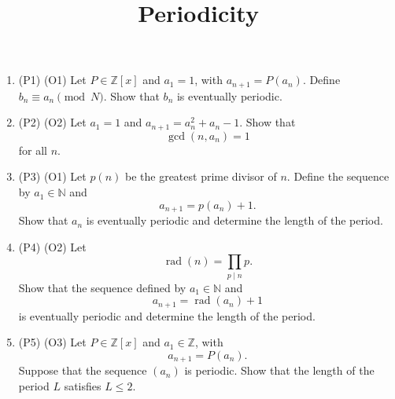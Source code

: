 \documentclass{article}
\title{Periodicity}
\author{}
\date{}
\begin{document}
	
	\maketitle
	
	\begin{enumerate}
		
		\item (P1) (O1) Let $P \in \mathbb{Z}[x]$ and $a_1 = 1$, with $a_{n+1} = P(a_n)$. Define $b_n \equiv a_n \pmod{N}$. Show that $b_n$ is eventually periodic.
		
		\item (P2) (O2) Let $a_1 = 1$ and $a_{n+1} = a_n^2 + a_n - 1$. Show that
		\[
		\gcd(n, a_n) = 1
		\]
		for all $n$.
		
		\item (P3) (O1) Let $p(n)$ be the greatest prime divisor of $n$. Define the sequence by $a_1 \in \mathbb{N}$ and
		\[
		a_{n+1} = p(a_n) + 1.
		\]
		Show that $a_n$ is eventually periodic and determine the length of the period.
		
		\item (P4) (O2) Let
		\[
		\operatorname{rad}(n) = \prod_{p \mid n} p.
		\]
		Show that the sequence defined by $a_1 \in \mathbb{N}$ and
		\[
		a_{n+1} = \operatorname{rad}(a_n) + 1
		\]
		is eventually periodic and determine the length of the period.
		
		\item (P5) (O3) Let $P \in \mathbb{Z}[x]$ and $a_1 \in \mathbb{Z}$, with
		\[
		a_{n+1} = P(a_n).
		\]
		Suppose that the sequence $(a_n)$ is periodic. Show that the length of the period $L$ satisfies $L \le 2$.
		
	\end{enumerate}
	
\end{document}
